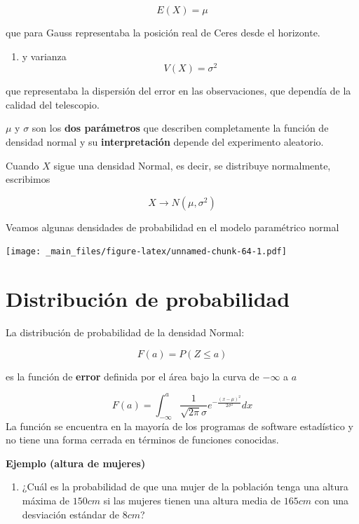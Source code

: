 \documentclass[
]{book}
\providecommand{\tightlist}{%
  \setlength{\itemsep}{0pt}\setlength{\parskip}{0pt}}
\begin{document}
\[E(X) = \mu\]

que para Gauss representaba la posición real de Ceres desde el horizonte.

\begin{enumerate}
\def\labelenumi{\arabic{enumi})}
\setcounter{enumi}{1}
\tightlist
\item
  y varianza
  \[V (X) = \sigma^2\]
\end{enumerate}

que representaba la dispersión del error en las observaciones, que dependía de la calidad del telescopio.

\(\mu\) y \(\sigma\) son los \textbf{dos parámetros} que describen completamente la función de densidad normal y su \textbf{interpretación} depende del experimento aleatorio.

Cuando \(X\) sigue una densidad Normal, es decir, se distribuye normalmente, escribimos

\[X\rightarrow N(\mu,\sigma^2)\]

Veamos algunas densidades de probabilidad en el modelo paramétrico normal

\texttt{[image: \_main\_files/figure-latex/unnamed-chunk-64-1.pdf]}

\hypertarget{distribuciuxf3n-de-probabilidad-2}{%
\section{Distribución de probabilidad}\label{distribuciuxf3n-de-probabilidad-2}}

La distribución de probabilidad de la densidad Normal:

\[F(a)=P(Z \leq a)\]

es la función de \textbf{error} definida por el área bajo la curva de \(-\infty\) a \(a\)

\[F(a)=\int_{-\infty}^{a}\frac{1}{\sqrt{2\pi}\sigma}e^{-\frac{(x-\mu) ^2}{2\sigma^2}} dx\]
La función se encuentra en la mayoría de los programas de software estadístico y no tiene una forma cerrada en términos de funciones conocidas.

\textbf{Ejemplo (altura de mujeres)}

\begin{enumerate}
\def\labelenumi{\arabic{enumi})}
\tightlist
\item
  ¿Cuál es la probabilidad de que una mujer de la población tenga una altura máxima de \(150cm\) si las mujeres tienen una altura media de \(165cm\) con una desviación estándar de \(8cm\)?
\end{enumerate}
\end{document}
